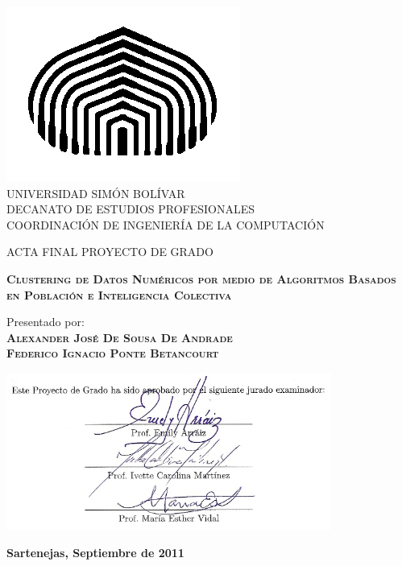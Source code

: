 \begin{titlepage}
\begin{center}

\includegraphics[scale=0.5,type=png,ext=.png,read=.png]{figures/cebolla} \\

\textsc {\large UNIVERSIDAD SIMÓN BOLÍVAR} \\
\textsc{DECANATO DE ESTUDIOS PROFESIONALES\\
COORDINACIÓN DE INGENIERÍA DE LA COMPUTACIÓN}

\bigskip
\bigskip
\bigskip
\bigskip
\bigskip
\bigskip

\textsc{ACTA FINAL PROYECTO DE GRADO}

\bigskip
\bigskip

\textsc{\bfseries Clustering de Datos Numéricos por medio de Algoritmos Basados en Población e Inteligencia Colectiva}

\bigskip
\bigskip
\bigskip
\bigskip

\begin{minipage}{\textwidth}
\centering
Presentado por: \\
\textsc{\bfseries Alexander José De Sousa De Andrade} \\
\textsc{\bfseries Federico Ignacio Ponte Betancourt} \\

\bigskip
\bigskip
\bigskip
\bigskip

\includegraphics[width=0.8\textwidth]{figures/firmas.jpg}\\

\end{minipage}

\bigskip
\bigskip
\vfill

{\large \bfseries Sartenejas, Septiembre de 2011}

\end{center}
\end{titlepage}
